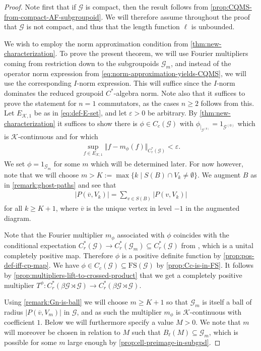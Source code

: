 \documentclass[11pt,a4paper,oneside,final,reqno]{amsart}
\theoremstyle{definition}
\newcommand{\G}{\mathcal{G}}
\newcommand{\Go}{\mathcal{G}^{(0)}}
\newcommand{\cK}{\mathcal{K}}
\newcommand{\FS}{\mathrm{FS}}
\newcommand{\Cred}{C_{r}^{*}}
\numberwithin{equation}{section}
\begin{document}
	
	\begin{proof}
		Note first that if $\G$ is compact, then the result follows from \cref{prop:CQMS-from-compact-AF-subgroupoid}. We will therefore assume throughout the proof that $\G$ is not compact, and thus that the length function $\ell$ is unbounded. 
		
		We wish to employ the norm approximation condition from \cref{thm:new-characterization}. To prove the present theorem, we will use Fourier multipliers coming from restriction down to the subgroupoids $\G_m$, and instead of the operator norm expression from \eqref{eq:norm-approximation-yields-CQMS}, we will use the corresponding $I$-norm expression. This will suffice since the $I$-norm dominates the reduced groupoid $C^*$-algebra norm. 
		Note also that it suffices to prove the statement for $n=1$ commutators, as the cases $n \geq 2$ follows from this. 
		Let
		$E_{\cK, 1}$ 
		be
		as in \eqref{eq:def-E-set}, 
		and let 
		$\varepsilon > 0$ be arbitrary.
		By \cref{thm:new-characterization} it suffices to show there is $\phi \in C_c(\G)$ with 
		$\phi_{\vert_{\Go}} = 1_{\Go}$
		which is $\cK$-continuous and for which 
		\begin{align*}
			\sup_{f\in E_{\cK, 1}} \Vert f - m_{\phi}(f) \Vert_{\Cred(\G)} < \varepsilon.
		\end{align*}
		We set $\phi = 1_{\G_m}$ for some $m$ which will be determined later.  For now however, note that we will choose $m > K:= \max \{ k \mid S(B) \cap V_k \neq \emptyset \}$. 
		We augment $B$ as in \cref{remark:ghost-paths} and see that 
		\begin{align*}
			\vert P(\overline{v}, V_k) \vert = \sum_{v \in S(B)}\vert P(v, V_k)\vert
		\end{align*}
		for all $k \geq K+1$, where $\overline{v}$ is the unique vertex in level $-1$ in the augmented diagram. 
		

		Note that the Fourier multiplier $m_\phi$ associated with $\phi$ coincides with the conditional expectation $\Cred (\G) \to \Cred(\G_m) \subseteq \Cred(\G)$ from \cite[Theorem 6.2]{HirschbergWu2021}, which is a unital completely positive map. Therefore $\phi$ is a positive definite function by \cref{prop:pos-def-iff-cp-map}. We have $\phi \in C_c(\G) \subseteq \FS(\G)$ by \cref{prop:Cc-is-in-FS}. It follows by \cref{prop:multipliers-lift-to-crossed-product} that we get a completely positive multiplier ${T^\phi} \colon \Cred (\beta \G \rtimes \G) \to \Cred(\beta \G \rtimes \G)$. 
		
		Using \cref{remark:Gn-is-ball} we will choose $m \geq K+1$ so that $\G_m$ is itself a ball of radius $\vert P(\overline{v}, V_m)\vert$ in $\G$, and as such  the multiplier $m_\phi$ is $\cK$-continuous with coefficient $1$. Below we will furthermore specify a value $M > 0$. We note that $m$ will moreover be chosen in relation to $M$ such that $B_\ell(M) \subseteq \G_m$, which is possible for some $m$ large enough by \cref{prop:ell-preimage-in-subgpd}. 
		

\end{proof}
\end{document}
